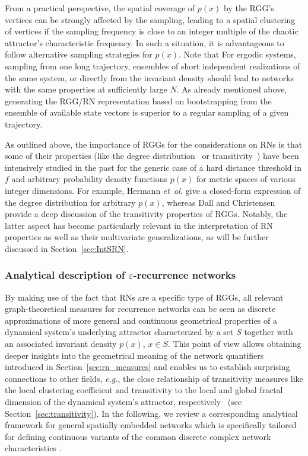 		From a practical perspective, the spatial coverage of $p(x)$ by the RGG's vertices can be strongly affected by the sampling, leading to a spatial clustering of vertices if the sampling frequency is close to an integer multiple of the chaotic attractor's characteristic frequency. In such a situation, it is advantageous to follow alternative sampling strategies for $p(x)$. Note that For ergodic systems, sampling from one long trajectory, ensembles of short independent realizations of the same system, or directly from the invariant density should lead to networks with the same properties at sufficiently large $N$. As already mentioned above, generating the RGG/RN representation based on bootstrapping from the ensemble of available state vectors is superior to a regular sampling of a given trajectory.

		As outlined above, the importance of RGGs for the considerations on RNs is that some of their properties (like the degree distribution~\cite{Herrmann2003} or transitivity~\cite{Dall2002}) have been intensively studied in the past for the generic case of a hard distance threshold in $f$ and arbitrary probability density functions $p(x)$ for metric spaces of various integer dimensions. For example, Hermann \textit{et~al.} \cite{Herrmann2003} give a closed-form expression of the degree distribution for arbitrary $p(x)$, whereas Dall and Christensen~\cite{Dall2002} provide a deep discussion of the transitivity properties of RGGs. Notably, the latter aspect has become particularly relevant in the interpretation of RN properties as well as their multivariate generalizations, as will be further discussed in Section~\ref{sec:IntSRN}.


		\subsubsection{Analytical description of $\varepsilon$-recurrence networks}
		By making use of the fact that RNs are a specific type of RGGs, all relevant graph-theoretical measures for recurrence networks can be seen as discrete approximations of more general and continuous geometrical properties of a dynamical system's underlying attractor characterized by a set $S$ together with an associated invariant density $p(x)$, $x\in S$. This point of view allows obtaining deeper insights into the geometrical meaning of the network quantifiers introduced in Section~\ref{sec:rn_measures} and enables us to establish surprising connections to other fields, \textit{e.g.}, the close relationship of transitivity measures like the local clustering coefficient and transitivity to the local and global fractal dimension of the dynamical system's attractor, respectively~\cite{Donner2011b} (see Section~\ref{sec:transitivity}). In the following, we review a corresponding analytical framework for general spatially embedded networks which is specifically tailored for defining continuous variants of the common discrete complex network characteristics \cite{Donges2012}.


